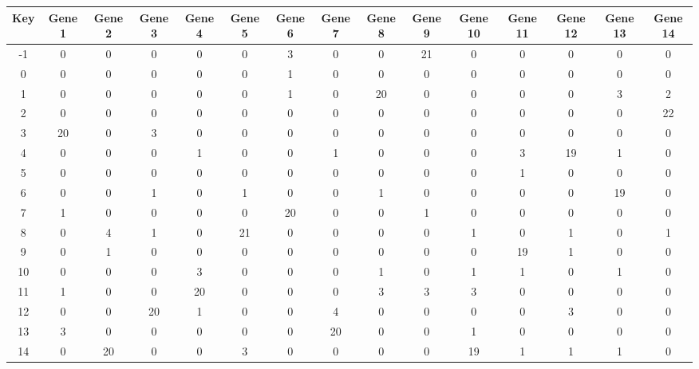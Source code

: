 \begin{tabular}{|c|c|c|c|c|c|c|c|c|c|c|c|c|c|c|}
\hline
Key & Gene 1 & Gene 2 & Gene 3 & Gene 4 & Gene 5 & Gene 6 & Gene 7 & Gene 8 & Gene 9 & Gene 10 & Gene 11 & Gene 12 & Gene 13 & Gene 14 \\
\hline
-1 & 0 & 0 & 0 & 0 & 0 & 3 & 0 & 0 & 21 & 0 & 0 & 0 & 0 & 0 \\
0 & 0 & 0 & 0 & 0 & 0 & 1 & 0 & 0 & 0 & 0 & 0 & 0 & 0 & 0 \\
1 & 0 & 0 & 0 & 0 & 0 & 1 & 0 & 20 & 0 & 0 & 0 & 0 & 3 & 2 \\
2 & 0 & 0 & 0 & 0 & 0 & 0 & 0 & 0 & 0 & 0 & 0 & 0 & 0 & 22 \\
3 & 20 & 0 & 3 & 0 & 0 & 0 & 0 & 0 & 0 & 0 & 0 & 0 & 0 & 0 \\
4 & 0 & 0 & 0 & 1 & 0 & 0 & 1 & 0 & 0 & 0 & 3 & 19 & 1 & 0 \\
5 & 0 & 0 & 0 & 0 & 0 & 0 & 0 & 0 & 0 & 0 & 1 & 0 & 0 & 0 \\
6 & 0 & 0 & 1 & 0 & 1 & 0 & 0 & 1 & 0 & 0 & 0 & 0 & 19 & 0 \\
7 & 1 & 0 & 0 & 0 & 0 & 20 & 0 & 0 & 1 & 0 & 0 & 0 & 0 & 0 \\
8 & 0 & 4 & 1 & 0 & 21 & 0 & 0 & 0 & 0 & 1 & 0 & 1 & 0 & 1 \\
9 & 0 & 1 & 0 & 0 & 0 & 0 & 0 & 0 & 0 & 0 & 19 & 1 & 0 & 0 \\
10 & 0 & 0 & 0 & 3 & 0 & 0 & 0 & 1 & 0 & 1 & 1 & 0 & 1 & 0 \\
11 & 1 & 0 & 0 & 20 & 0 & 0 & 0 & 3 & 3 & 3 & 0 & 0 & 0 & 0 \\
12 & 0 & 0 & 20 & 1 & 0 & 0 & 4 & 0 & 0 & 0 & 0 & 3 & 0 & 0 \\
13 & 3 & 0 & 0 & 0 & 0 & 0 & 20 & 0 & 0 & 1 & 0 & 0 & 0 & 0 \\
14 & 0 & 20 & 0 & 0 & 3 & 0 & 0 & 0 & 0 & 19 & 1 & 1 & 1 & 0 \\
\hline
\end{tabular}